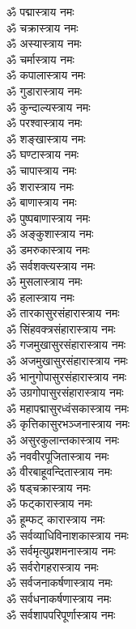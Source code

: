 \begin{flushleft}
\begin{multicols}{2}
ॐ पद्मास्त्राय नमः\\
ॐ चक्रास्त्राय नमः\\
ॐ अस्यास्त्राय नमः\\
ॐ चर्मास्त्राय नमः\hfill{}\\
ॐ कपालास्त्राय नमः\\
ॐ गुडारास्त्राय नमः  \\
ॐ कुन्दाल्यस्त्राय नमः \\
ॐ परश्वास्त्राय नमः\\
ॐ शङ्खास्त्राय नमः\\
ॐ घण्टास्त्राय नमः\\
ॐ चापास्त्राय नमः\\
ॐ शरास्त्राय नमः\\
ॐ बाणास्त्राय नमः\\
ॐ पुष्पबाणास्त्राय नमः\hfill{}\\
ॐ अङ्कुशास्त्राय नमः\\
ॐ डमरुकास्त्राय नमः\\
ॐ सर्वशक्त्यस्त्राय नमः\\
ॐ मुसलास्त्राय नमः\\
ॐ हलास्त्राय नमः\\
ॐ तारकासुरसंहारास्त्राय नमः\\
ॐ सिंहवक्त्रसंहारास्त्राय नमः\\
ॐ गजमुखासुरसंहारास्त्राय नमः\\
ॐ अजमुखासुरसंहारास्त्राय नमः\\
ॐ भानुगोपासुरसंहारास्त्राय नमः \hfill{}\\
ॐ उग्रगोपासुरसंहारास्त्राय नमः \\
ॐ महापद्मासुरध्वंसकास्त्राय नमः\\
ॐ कृत्तिकासुरभञ्जनास्त्राय नमः\\
ॐ असुरकुलान्तकास्त्राय नमः\\
ॐ नववीरपूजितास्त्राय नमः\\
ॐ वीरबाहूवन्दितास्त्राय नमः\\
ॐ षड्चक्रास्त्राय नमः\\
ॐ फट्कारास्त्राय नमः\\
ॐ हूम्फट् कारास्त्राय नमः\\
ॐ सर्वव्याधिविनाशकास्त्राय नमः\hfill{}\\
ॐ सर्वमृत्युप्रशमनास्त्राय नमः\\
ॐ सर्वरोगहरास्त्राय नमः\\
ॐ सर्वजनाकर्षणास्त्राय नमः\\
ॐ सर्वधनाकर्षणास्त्राय नमः\\
ॐ सर्वशापपरिपूर्णास्त्राय नमः\\

\end{multicols}
\end{flushleft}
